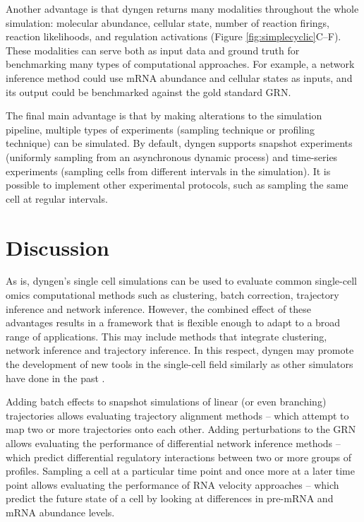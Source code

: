 
Another advantage is that dyngen returns many modalities throughout the whole simulation: molecular abundance, cellular state, number of reaction firings, reaction likelihoods, and regulation activations (Figure \ref{fig:simplecyclic}C--F). These modalities can serve both as input data and ground truth for benchmarking many types of computational approaches. For example, a network inference method could use mRNA abundance and cellular states as inputs, and its output could be benchmarked against the gold standard GRN.


The final main advantage is that by making alterations to the simulation pipeline, multiple types of experiments (sampling technique or profiling technique) can be simulated. By default, dyngen supports snapshot experiments (uniformly sampling from an asynchronous dynamic process) and time-series experiments (sampling cells from different intervals in the simulation). 
It is possible to implement other experimental protocols, such as sampling the same cell at regular intervals. 



\section{Discussion}
As is, dyngen's single cell simulations can be used to evaluate common single-cell omics computational methods such as clustering, batch correction, trajectory inference and network inference.
However, the combined effect of these advantages results in a framework that is flexible enough to adapt to a broad range of applications. This may include methods that integrate clustering, network inference and trajectory inference. In this respect, dyngen may promote the development of new tools in the single-cell field similarly as other simulators have done in the past \cite{schaffter_genenetweaversilicobenchmark_2011,ewing_combiningtumorgenome_2015}.

Adding batch effects to snapshot simulations of linear (or even branching) trajectories allows evaluating trajectory alignment methods -- which attempt to map two or more trajectories onto each other. Adding perturbations to the GRN allows evaluating the performance of differential network inference methods -- which predict differential regulatory interactions between two or more groups of profiles.  Sampling a cell at a particular time point and once more at a later time point allows evaluating the performance of RNA velocity approaches -- which predict the future state of a cell by looking at differences in pre-mRNA and mRNA abundance levels.

